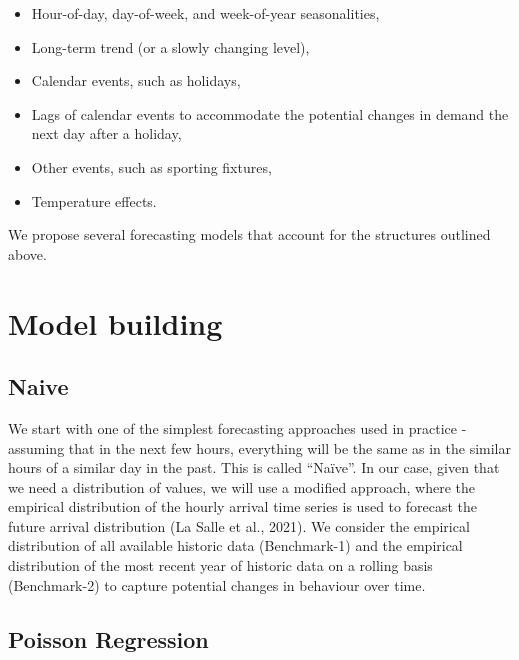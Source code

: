 \documentclass[]{elsarticle} %
\providecommand{\tightlist}{%
  \setlength{\itemsep}{0pt}\setlength{\parskip}{0pt}}
\begin{document}
\begin{itemize}
\tightlist
\item
  Hour-of-day, day-of-week, and week-of-year seasonalities,
\item
  Long-term trend (or a slowly changing level),
\item
  Calendar events, such as holidays,
\item
  Lags of calendar events to accommodate the potential changes in
  demand the next day after a holiday,
\item
  Other events, such as sporting fixtures,
\item
  Temperature effects.
\end{itemize}

We propose several forecasting models that account for the structures
outlined above.

\hypertarget{model}{%
\section{Model building}\label{model}}

\hypertarget{naive}{%
\subsection{Naive}\label{naive}}

We start with one of the simplest forecasting approaches used in
practice - assuming that in the next few hours, everything will be the
same as in the similar hours of a similar day in the past. This is
called ``Naïve''. In our case, given that we need a distribution of
values, we will use a modified approach, where the
empirical distribution of the hourly arrival time series is used to
forecast the future arrival distribution (La Salle et al., 2021). We consider the
empirical distribution of all available historic data (Benchmark-1) and
the empirical distribution of the most recent year of historic data on a
rolling basis (Benchmark-2) to capture potential changes in behaviour
over time.

\hypertarget{poisson-regression}{%
\subsection{Poisson Regression}\label{poisson-regression}}
\end{document}
